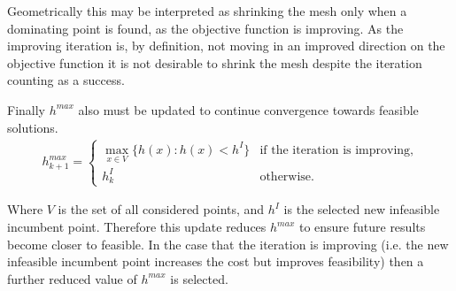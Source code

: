 Geometrically this may be interpreted as shrinking the mesh only when a dominating point is found, as the objective function is improving. As the improving iteration is, by definition, not moving in an improved direction on the objective function it is not desirable to shrink the mesh despite the iteration counting as a success.

Finally $h^{max}$ also must be updated to continue convergence towards feasible solutions. 
\begin{gather}\label{eqn:hmax_update}
    h_{k+1}^{max} = 
    \begin{cases}   
        \max\limits_{x\in V} \{h(x) : h(x) < h^I\} & \text{if the iteration is improving}, \\
        h^I_k & \text{otherwise}.
    \end{cases}
\end{gather}

Where $V$ is the set of all considered points, and $h^I$ is the selected new infeasible incumbent point. Therefore this update reduces $h^{max}$ to ensure future results become closer to feasible. In the case that the iteration is improving (i.e. the new infeasible incumbent point increases the cost but improves feasibility) then a further reduced value of $h^{max}$ is selected. 